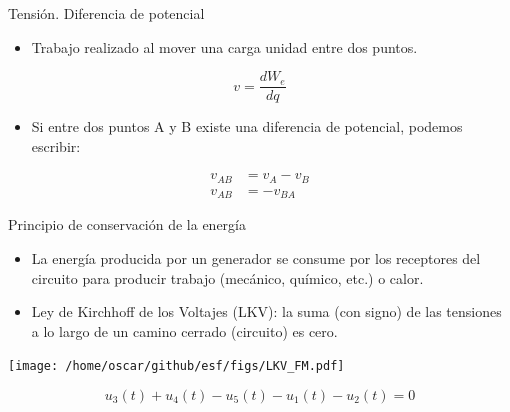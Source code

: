 \documentclass[xcolor={usenames,svgnames,dvipsnames}]{beamer}
\begin{document}
\begin{frame}[label={sec:orgf582130}]{Tensión. Diferencia de potencial}
\begin{itemize}
\item \alert{Trabajo realizado al mover una carga unidad entre dos puntos}.
\end{itemize}

\[
v=\frac{dW_{e}}{dq}
\]

\begin{itemize}
\item Si entre dos puntos A y B existe una diferencia de potencial, podemos
escribir:
\end{itemize}
\begin{align*}
         v_{AB} &=  v_{A}-v_{B}\\
         v_{AB} &=  -v_{BA}
\end{align*}
\end{frame}

\begin{frame}[label={sec:org59a9944}]{Principio de conservación de la energía}
\begin{itemize}
\item La energía producida por un generador se consume por los receptores
del circuito para producir trabajo (mecánico, químico, etc.) o
calor.

\item \alert{Ley de Kirchhoff de los Voltajes (LKV)}: la suma (con signo) de las
tensiones a lo largo de un camino cerrado (circuito) es cero.
\end{itemize}

\begin{center}
\texttt{[image: /home/oscar/github/esf/figs/LKV\_FM.pdf]}
\end{center}

\[
u_3(t) + u_4 (t) - u_5 (t) - u_1 (t) - u_2 (t)  = 0
\]
\end{frame}
\end{document}
